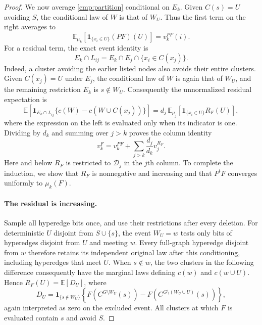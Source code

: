 \begin{proof}
We now average \eqref{cmp:partition} conditional on $E_k$. Given
$C(s)=U$ avoiding $S$, the conditional law of $W$ is that of $W_U$.
Thus the first term on the right averages to
\[
 \mathbb E_{\mu_k}[\mathbf 1_{\{x_i\in U\}}(PF)(U)]
 =v_k^{PF}(i).
\]
For a residual term, the exact event identity is
\[
 E_k\cap L_{ij}
 =E_k\cap E_j\cap\{x_i\in C(x_j)\}.
\]
Indeed, a cluster avoiding the earlier listed nodes also avoids their entire
clusters. Given $C(x_j)=U$ under $E_j$, the conditional law of $W$ is again
that of $W_U$, and the remaining restriction $E_k$ is $s\notin W_U$.
Consequently the unnormalized residual expectation is
\[
 \mathbb E\!\left[
  \mathbf 1_{E_k\cap L_{ij}}
   \{c(W)-c(W\cup C(x_j))\}\right]
 =d_j\,\mathbb E_{\mu_j}
       [\mathbf 1_{\{x_i\in U\}}R_F(U)],
\]
where the expression on the left is evaluated only when its indicator is one.
Dividing by $d_k$ and summing over $j>k$ proves the column identity
\begin{equation}\label{cmp:column-identity}
 v_k^F=v_k^{PF}+\sum_{j>k}\frac{d_j}{d_k}v_j^{R_F}.
\end{equation}
Here and below $R_F$ is restricted to $\mathcal D_j$ in the $j$th column.
To complete the induction, we show that $R_F$ is nonnegative and increasing
and that $P^tF$ converges uniformly to $\mu_k(F)$.

\paragraph{The residual is increasing.}
Sample all hyperedge bits once, and use their restrictions after every
deletion. For deterministic $U$ disjoint from $S\cup\{s\}$, the event
$W_U=w$ tests only bits of hyperedges disjoint from $U$ and meeting $w$.
Every full-graph hyperedge disjoint from $w$ therefore retains its independent
original law after this conditioning, including hyperedges that meet $U$.
When $s\notin w$, the two clusters in the following difference consequently
have the marginal laws defining $c(w)$ and $c(w\cup U)$.
Hence $R_F(U)=\mathbb E[D_U]$, where
\begin{equation}\label{cmp:residual-sample}
 D_U=\mathbf 1_{\{s\notin W_U\}}
 \left\{F(C^{G\setminus W_U}(s))
       -F(C^{G\setminus(W_U\cup U)}(s))\right\},
\end{equation}
again interpreted as zero on the excluded event. All clusters at which
$F$ is evaluated contain $s$ and avoid $S$.


\end{proof}
